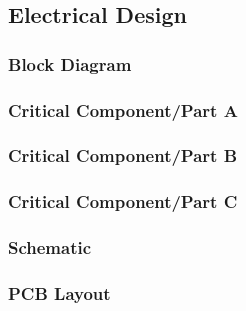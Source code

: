\pagebreak
\subsection{Electrical Design}

\subsubsection{Block Diagram}
\label{sec:4.5.1}

\subsubsection{Critical Component/Part A}

\subsubsection{Critical Component/Part B}

\subsubsection{Critical Component/Part C}

\subsubsection{Schematic}

\subsubsection{PCB Layout}

\raggedbottom